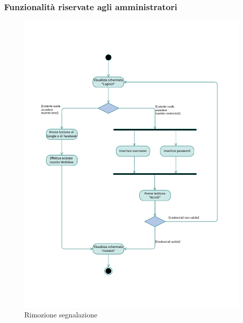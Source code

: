 \documentclass{natourDoc}
\begin{document}
\subsubsection {Funzionalità riservate agli amministratori}
\begin{figure}[!htbp]
	\centering
	\includegraphics[width=\textwidth, page=18]{./diagrams/activity.pdf}
	\caption{Rimozione segnalazione}
\end{figure}
\FloatBarrier
\end{document}
